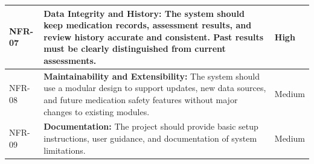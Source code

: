 \begin{longtable}{|L{0.13\textwidth}|L{0.68\textwidth}|L{0.10\textwidth}|}
NFR-07
& \textbf{Data Integrity and History:}
The system should keep medication records,
assessment results, and review history
accurate and consistent. Past results
must be clearly distinguished from
current assessments.
& High
\\ \hline

NFR-08
& \textbf{Maintainability and Extensibility:}
The system should use a modular design
to support updates, new data sources,
and future medication safety features
without major changes to existing modules.
& Medium
\\ \hline

NFR-09
& \textbf{Documentation:}
The project should provide basic setup
instructions, user guidance, and
documentation of system limitations.
& Medium
\\ \hline

\end{longtable}
